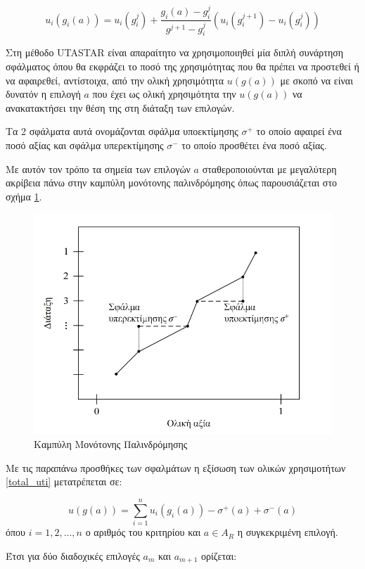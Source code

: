 \documentclass[11pt,a4paper,titlepage]{article}
\numberwithin{equation}{section}
\begin{document}
\begin{equation}\label{linear_inter}
	u_{i}(g_{i}(a)) = u_{i}(g^{j}_{i}) + \frac{g_{i}(a)-g^{j}_{i}}{g^{j+1}-g^{j}_{i}}(u_{i}(g_{i}^{j+1})-u_{i}(g_{i}^{j}))
\end{equation}


Στη μέθοδο UTASTAR είναι απαραίτητο να χρησιμοποιηθεί μία διπλή συνάρτηση σφάλματος όπου θα εκφράζει το ποσό της χρησιμότητας που θα πρέπει να προστεθεί ή να αφαιρεθεί, αντίστοιχα, από την ολική χρησιμότητα $u(g(a))$ με σκοπό να είναι δυνατόν η επιλογή $a$ που έχει ως ολική χρησιμότητα την $u(g(a))$ να ανακατακτήσει την θέση της στη διάταξη των επιλογών.

Τα 2 σφάλματα αυτά ονομάζονται σφάλμα υποεκτίμησης $σ^{+}$ το οποίο αφαιρεί ένα ποσό αξίας και σφάλμα υπερεκτίμησης $σ^{-}$ το οποίο προσθέτει ένα ποσό αξίας.

Με αυτόν τον τρόπο τα σημεία των επιλογών $a$ σταθεροποιούνται με μεγαλύτερη ακρίβεια πάνω στην καμπύλη μονότονης παλινδρόμησης όπως παρουσιάζεται στο σχήμα \ref{fig:graph_monot}.

\begin{figure}[H]
	\centering
	\includegraphics[width=0.7\linewidth]{media/graph_mono.jpg}
	\caption{Καμπύλη Μονότονης Παλινδρόμησης}
	\label{fig:graph_monot}
\end{figure}

Με τις παραπάνω προσθήκες των σφαλμάτων η εξίσωση των ολικών χρησιμοτήτων \ref{total_uti} μετατρέπεται σε:

\begin{equation}\label{total_uti_fin}
	u(g(a)) = \sum_{i=1}^{n} u_{i}(g_{i}(a)) - σ^{+}(a) + σ^{-}(a)
\end{equation}
όπου $i = 1,2,...,n$ ο αριθμός του κριτηρίου και $a\in A_{R}$ η συγκεκριμένη επιλογή.

Έτσι για δύο διαδοχικές επιλογές $a_{m}$ και $a_{m+1}$ ορίζεται:
\end{document}
